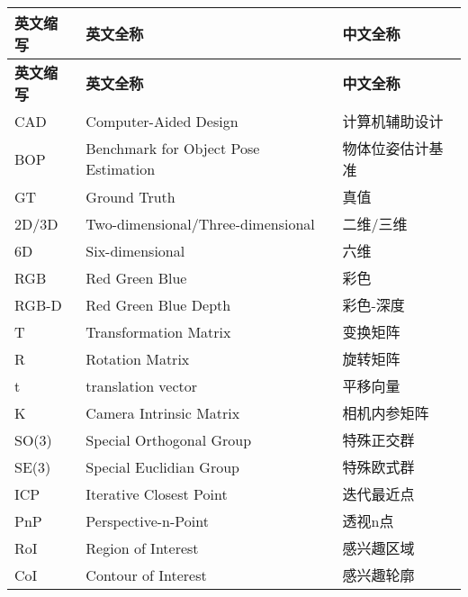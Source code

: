 \cleardoublepage
{}
\begin{center}
    \begin{longtable}{m{2cm}m{8cm}m{5cm}}
        \toprule
        \textbf{英文缩写}&\textbf{英文全称}&\textbf{中文全称}\\
        \midrule
        \endfirsthead
        \toprule
        \textbf{英文缩写}&\textbf{英文全称}&\textbf{中文全称}\\
        \midrule
        \endhead 
        \bottomrule
        \endfoot
        \bottomrule
        \endlastfoot
        CAD&Computer-Aided Design&计算机辅助设计\\
        BOP&Benchmark for Object Pose Estimation&物体位姿估计基准\\
        GT&Ground Truth&真值\\
        2D/3D&Two-dimensional/Three-dimensional&二维/三维\\
        6D&Six-dimensional&六维\\
        RGB&Red Green Blue&彩色\\
        RGB-D&Red Green Blue Depth&彩色-深度\\
        T&Transformation Matrix&变换矩阵\\
        R&Rotation Matrix&旋转矩阵\\
        t&translation vector&平移向量\\
        K&Camera Intrinsic Matrix&相机内参矩阵\\
        SO(3)&Special Orthogonal Group&特殊正交群\\
        SE(3)&Special Euclidian Group&特殊欧式群\\
        ICP&Iterative Closest Point&迭代最近点\\
        PnP&Perspective-n-Point&透视n点\\
        RoI&Region of Interest&感兴趣区域\\
        CoI&Contour of Interest&感兴趣轮廓\\

	\end{longtable}
\end{center}